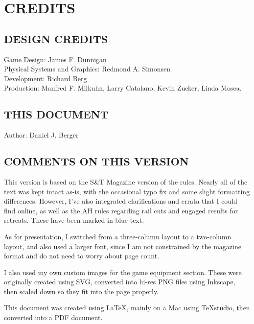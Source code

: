 \section{CREDITS}

\subsection{DESIGN CREDITS}

Game Design: James F. Dunnigan\\
Physical Systems and Graphics: Redmond A. Simonsen\\
Development: Richard Berg\\
Production: Manfred F. Milkuhn, Larry Catalano, Kevin Zucker, Linda Mosca.

\subsection{THIS DOCUMENT}

Author: Daniel J. Berger

\subsection{COMMENTS ON THIS VERSION}

This version is based on the S\&T Magazine version of the rules. Nearly all of the text was kept intact as-is, with the occasional typo fix and some slight formatting differences. However, I've also integrated clarifications and errata that I could find online, as well as the AH rules regarding rail cuts and engaged results for retreats. These have been marked in blue text.

As for presentation, I switched from a three-column layout to a two-column layout, and also used a larger font, since I am not constrained by the magazine format and do not need to worry about page count.

I also used my own custom images for the game equipment section. These were originally created using SVG, converted into hi-res PNG files using Inkscape, then scaled down so they fit into the page properly.

This document was created using LaTeX, mainly on a Mac using TeXstudio, then converted into a PDF document.
